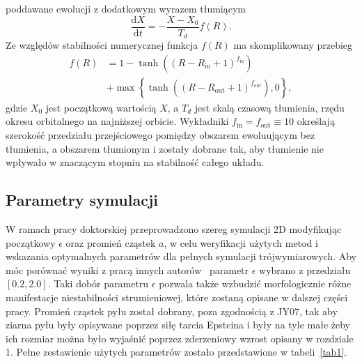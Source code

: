 poddawane ewolucji z dodatkowym wyrazem tłumiącym
\begin{equation}
  \frac{\textrm{d}X}{\textrm{d}t} = - \frac{X-X_0}{T_d}f(R).
\end{equation}
Ze względów stabilności numerycznej funkcja $f(R)$ ma skomplikowany przebieg
\begin{equation}
   \begin{split} 
      f(R) &= 1 - \tanh\left(\left(R - R_\textrm{in} + 1
      \right)^{f_\textrm{in}}\right)\\ &+ \max\left\{ \tanh\left(\left(R -
      R_\textrm{out} + 1\right)^{f_\textrm{out}}\right), 0\right\}, 
   \end{split}
\end{equation}
gdzie $X_0$ jest początkową wartością $X$, a $T_d$ jest skalą czasową tłumienia,
rzędu okresu orbitalnego na najniższej orbicie.
Wykładniki $f_\textrm{in}=f_\textrm{out}\equiv10$ określają szerokość przedziału
przejściowego pomiędzy obszarem ewoluującym bez tłumienia, a obszarem tłumionym
i zostały dobrane tak, aby tłumienie nie wpływało w znaczącym stopniu na
stabilność całego układu.
%
\subsection{Parametry symulacji}\label{ch2:simpar}
%
W ramach pracy doktorskiej przeprowadzono szereg symulacji 2D modyfikując
początkowy $\epsilon$ oraz promień cząstek $a$, w celu weryfikacji użytych metod
i wskazania optymalnych parametrów dla pełnych symulacji trójwymiarowych. Aby
móc porównać wyniki z pracą innych autorów~\citep{JY07} parametr $\epsilon$
wybrano z przedziału $[0.2, 2.0]$. Taki dobór parametru $\epsilon$ pozwala także
wzbudzić morfologicznie różne manifestacje niestabilności strumieniowej, które
zostaną opisane w dalszej części pracy. Promień cząstek pyłu został dobrany,
poza zgodnością z JY07, tak aby ziarna pyłu były opisywane poprzez siłę tarcia
Epsteina i były na tyle małe żeby ich rozmiar można było wyjaśnić poprzez
zderzeniowy wzrost opisany w rozdziale 1. Pełne zestawienie użytych parametrów
zostało przedstawione w tabeli~\ref{tab1}.

